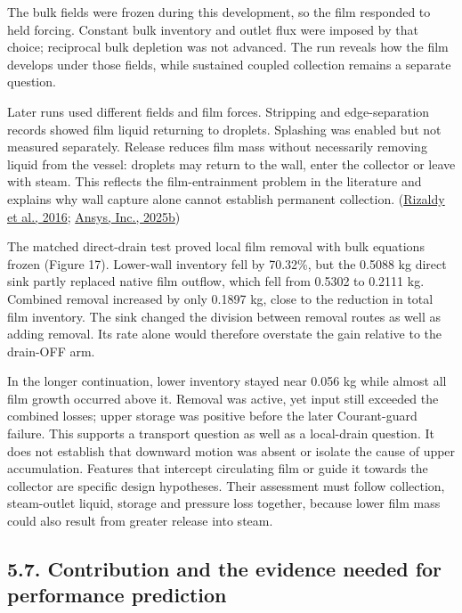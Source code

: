 \documentclass[
  12pt,
  a4paper,
]{article}
\begin{document}
The bulk fields were frozen during this development, so the film
responded to held forcing. Constant bulk inventory and outlet flux were
imposed by that choice; reciprocal bulk depletion was not advanced. The
run reveals how the film develops under those fields, while sustained
coupled collection remains a separate question.

Later runs used different fields and film forces. Stripping and
edge-separation records showed film liquid returning to droplets.
Splashing was enabled but not measured separately. Release reduces film
mass without necessarily removing liquid from the vessel: droplets may
return to the wall, enter the collector or leave with steam. This
reflects the film-entrainment problem in the literature and explains why
wall capture alone cannot establish permanent collection.
(\href{https://www.researchgate.net/publication/310818568_LIQUID_CARRYOVER_IN_GEOTHERMAL_STEAM-WATER_SEPARATORS}{Rizaldy
et al., 2016};
\href{https://ansyshelp.ansys.com/public/Views/Secured/corp/v252/en/flu_th/flu_th_ewf_sec_film_submodels.html}{Ansys,
Inc., 2025b})

The matched direct-drain test proved local film removal with bulk
equations frozen (Figure 17). Lower-wall inventory fell by 70.32\%, but
the 0.5088 kg direct sink partly replaced native film outflow, which
fell from 0.5302 to 0.2111 kg. Combined removal increased by only 0.1897
kg, close to the reduction in total film inventory. The sink changed the
division between removal routes as well as adding removal. Its rate
alone would therefore overstate the gain relative to the drain-OFF arm.

In the longer continuation, lower inventory stayed near 0.056 kg while
almost all film growth occurred above it. Removal was active, yet input
still exceeded the combined losses; upper storage was positive before
the later Courant-guard failure. This supports a transport question as
well as a local-drain question. It does not establish that downward
motion was absent or isolate the cause of upper accumulation. Features
that intercept circulating film or guide it towards the collector are
specific design hypotheses. Their assessment must follow collection,
steam-outlet liquid, storage and pressure loss together, because lower
film mass could also result from greater release into steam.

\subsection{5.7. Contribution and the evidence needed for performance
prediction}\label{contribution-and-the-evidence-needed-for-performance-prediction}
\end{document}
